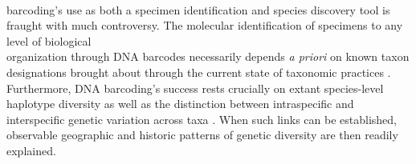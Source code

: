 \\ barcoding's use as both a specimen identification and species discovery tool is fraught with much controversy. The molecular identification of specimens to any level of biological \\ organization through DNA barcodes necessarily depends \textit{a priori} on known taxon \\ designations brought about through the current state of taxonomic practices \cite{desalle2006species}. \\ Furthermore, DNA barcoding's success rests crucially on extant species-level haplotype diversity as well as the distinction between intraspecific and interspecific genetic variation across taxa \cite{phillips2019incomplete}. When such links can be established, observable geographic and historic patterns of genetic diversity are then readily explained.



